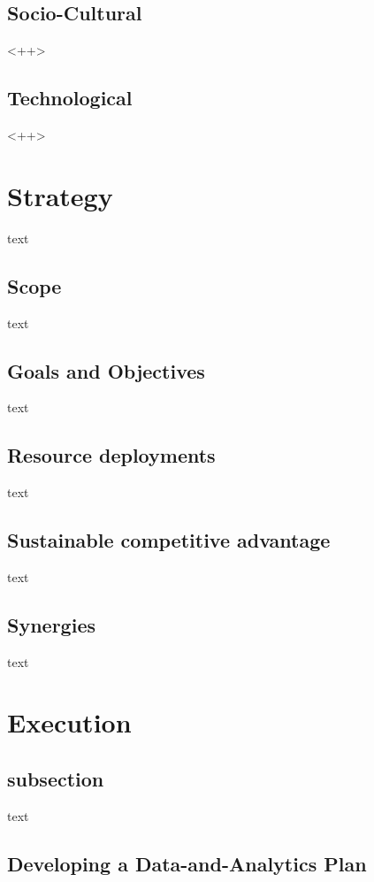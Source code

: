 \documentclass[10pt]{article} %
\begin{document}
\subsection{Socio-Cultural}<++>
\subsection{Technological}<++>
\section{Strategy}
text

\subsection{Scope}

text

\subsection{Goals and Objectives}

text

\subsection{Resource deployments}

text

\subsection{Sustainable competitive advantage}

text

\subsection{Synergies}

text


\section{Execution}

\subsection{subsection}

text


\subsection{Developing a Data-and-Analytics Plan}
\end{document}
